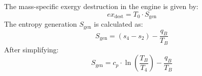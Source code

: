 The mass-specific exergy destruction in the engine is given by:  
\[
ex_{\text{dest}} = T_0 \cdot S_{\text{gen}}
\]  
The entropy generation \( S_{\text{gen}} \) is calculated as:  
\[
S_{\text{gen}} = (s_4 - s_2) - \frac{q_B}{T_B}
\]  
After simplifying:  
\[
S_{\text{gen}} = c_p \cdot \ln \left( \frac{T_B}{T_4} \right) - \frac{q_B}{T_B}
\]